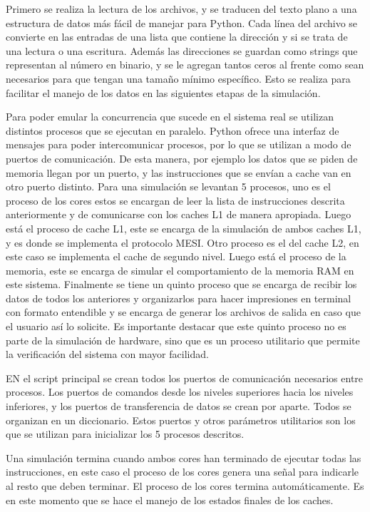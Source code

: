 \documentclass {article}
\begin{document}
Primero se realiza la lectura de los archivos, y se traducen del texto plano a una estructura de
datos más fácil de manejar para Python. Cada línea del archivo se convierte en las entradas de una
lista que contiene la dirección y si se trata de una lectura o una escritura. Además las
direcciones se guardan como strings que representan al número en binario, y se le agregan tantos
ceros al frente como sean necesarios para que tengan una tamaño mínimo específico. Esto se realiza
para facilitar el manejo de los datos en las siguientes etapas de la simulación.


Para poder emular la concurrencia que sucede en el sistema real se utilizan distintos procesos que se
ejecutan en paralelo. Python ofrece una interfaz de mensajes para poder intercomunicar procesos, por
lo que se utilizan a modo de puertos de comunicación. De esta manera, por ejemplo los datos que se
piden de memoria llegan por un puerto, y las instrucciones que se envían a cache van en otro puerto
distinto. Para una simulación se levantan 5 procesos, uno es el proceso de los cores estos se
encargan de leer la lista de instrucciones descrita anteriormente y de comunicarse con los caches
L1 de manera apropiada. Luego está el proceso de cache L1, este se encarga de la simulación de
ambos caches L1, y es donde se implementa el protocolo MESI. Otro proceso es el del cache L2, en este
caso se implementa el cache de segundo nivel. Luego está el proceso de la memoria, este se encarga
de simular el comportamiento de la memoria RAM en este sistema. Finalmente se tiene un quinto
proceso que se encarga de recibir los datos de todos los anteriores y organizarlos para hacer
impresiones en terminal con formato entendible y se encarga de generar los archivos de salida en caso
que el usuario así lo solicite. Es importante destacar que este quinto proceso no es parte de la
simulación de hardware, sino que es un proceso utilitario que permite la verificación del sistema
con mayor facilidad.

EN el script principal se crean todos los puertos de comunicación necesarios entre procesos. Los
puertos de comandos desde los niveles superiores hacia los niveles inferiores, y los puertos de
transferencia de datos se crean por aparte. Todos se organizan en un diccionario. Estos puertos y
otros parámetros utilitarios son los que se utilizan para inicializar los 5 procesos descritos.

Una simulación termina cuando ambos cores han terminado de ejecutar todas las instrucciones, en este
caso el proceso de los cores genera una señal para indicarle al resto que deben terminar. El proceso
de los cores termina automáticamente. Es en este momento que se hace el manejo de los estados
finales de los caches.
\end{document}
